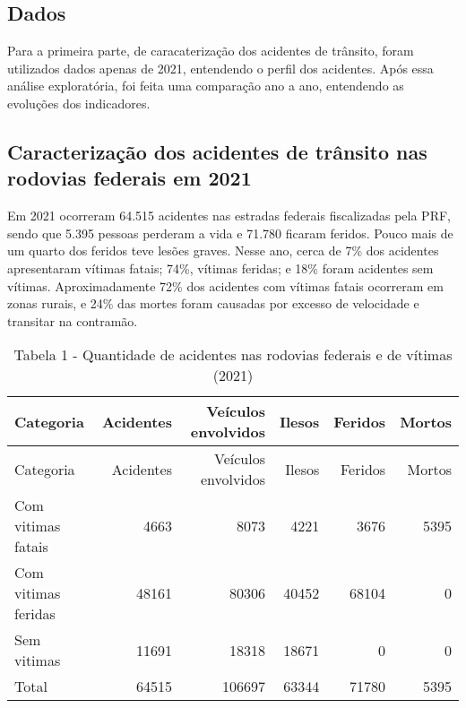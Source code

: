 \documentclass[
]{article}
\begin{document}
\hypertarget{dados}{%
\subsection{Dados}\label{dados}}

Para a primeira parte, de caracaterização dos acidentes de trânsito,
foram utilizados dados apenas de 2021, entendendo o perfil dos
acidentes. Após essa análise exploratória, foi feita uma comparação ano
a ano, entendendo as evoluções dos indicadores.

\hypertarget{caracterizauxe7uxe3o-dos-acidentes-de-truxe2nsito-nas-rodovias-federais-em-2021}{%
\subsection{Caracterização dos acidentes de trânsito nas rodovias
federais em
2021}\label{caracterizauxe7uxe3o-dos-acidentes-de-truxe2nsito-nas-rodovias-federais-em-2021}}

Em 2021 ocorreram 64.515 acidentes nas estradas federais fiscalizadas
pela PRF, sendo que 5.395 pessoas perderam a vida e 71.780 ficaram
feridos. Pouco mais de um quarto dos feridos teve lesões graves. Nesse
ano, cerca de 7\% dos acidentes apresentaram vítimas fatais; 74\%,
vítimas feridas; e 18\% foram acidentes sem vítimas. Aproximadamente
72\% dos acidentes com vítimas fatais ocorreram em zonas rurais, e 24\%
das mortes foram causadas por excesso de velocidade e transitar na
contramão.

\begin{longtable}[]{@{}lrrrrr@{}}
\caption{Tabela 1 - Quantidade de acidentes nas rodovias federais e de
vítimas (2021)}\tabularnewline
\toprule
Categoria & Acidentes & Veículos envolvidos & Ilesos & Feridos &
Mortos \\
\midrule
\endfirsthead
\toprule
Categoria & Acidentes & Veículos envolvidos & Ilesos & Feridos &
Mortos \\
\midrule
\endhead
Com vitimas fatais & 4663 & 8073 & 4221 & 3676 & 5395 \\
Com vitimas feridas & 48161 & 80306 & 40452 & 68104 & 0 \\
Sem vitimas & 11691 & 18318 & 18671 & 0 & 0 \\
Total & 64515 & 106697 & 63344 & 71780 & 5395 \\
\bottomrule
\end{longtable}
\end{document}
